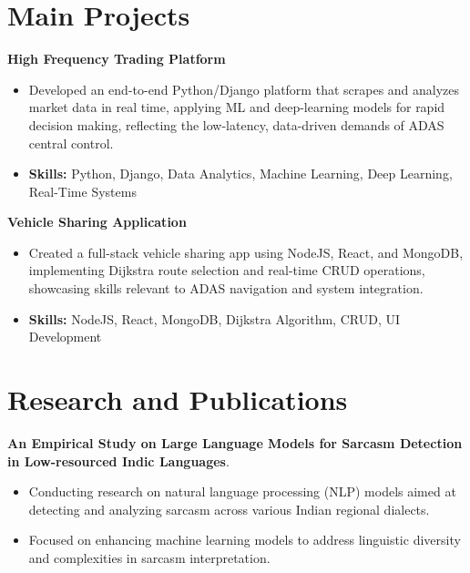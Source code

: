 \documentclass[a4paper,11pt]{article}
\begin{document}
\section{\textbf{Main Projects}}

\vspace{1mm}
  \textbf{High Frequency Trading Platform  }
\vspace{-1.5mm} %
\begin{itemize}
  \item Developed an end-to-end Python/Django platform that scrapes and analyzes market data in real time, applying ML and deep-learning models for rapid decision making, reflecting the low-latency, data-driven demands of ADAS central control.
\vspace{-3mm}
  \item \textbf{Skills:} Python, Django, Data Analytics, Machine Learning, Deep Learning, Real-Time Systems
\end{itemize}


\vspace{1mm}
   \textbf{Vehicle Sharing Application }
\vspace{-1.5mm} %
\begin{itemize}
  \item Created a full-stack vehicle sharing app using NodeJS, React, and MongoDB, implementing Dijkstra route selection and real-time CRUD operations, showcasing skills relevant to ADAS navigation and system integration.
\vspace{-3mm}
  \item \textbf{Skills:} NodeJS, React, MongoDB, Dijkstra Algorithm, CRUD, UI Development
\end{itemize}



\section{\textbf{Research and Publications} \hfill }
\vspace{1mm}
  \textbf{An Empirical Study on Large Language Models for Sarcasm Detection in Low-resourced Indic Languages}.
\vspace{-1mm} %
\begin{itemize}
  \item Conducting research on natural language processing (NLP) models aimed at detecting and analyzing sarcasm across various Indian regional dialects.
\vspace{-3mm}
  \item Focused on enhancing machine learning models to address linguistic diversity and complexities in sarcasm interpretation.
\end{itemize}
\end{document}
